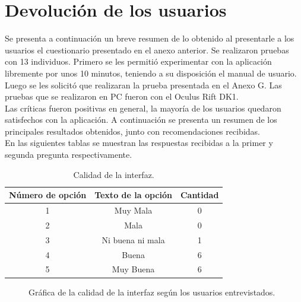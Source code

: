 \documentclass[12pt]{article}
\begin{document}
\section{Devolución de los usuarios}
Se presenta a continuación un breve resumen de lo obtenido al presentarle a los usuarios el cuestionario presentado en el anexo anterior. Se realizaron pruebas con 13 individuos. Primero se les permitió experimentar con la aplicación libremente por unos 10 minutos, teniendo a su disposición el manual de usuario. Luego se les solicitó que realizaran la prueba presentada en el Anexo G. Las pruebas que se realizaron en PC fueron con el Oculus Rift DK1.
\\Las críticas fueron positivas en general, la mayoría de los usuarios quedaron satisfechos con la aplicación. A continuación se presenta un resumen de los principales resultados obtenidos, junto con recomendaciones recibidas.
\\En las siguientes tablas se muestran las respuestas recibidas a la primer y segunda pregunta respectivamente.
\begin{table}[h!]
  \centering
  \label{tab:table1}
  \begin{tabular}{ccc}
    \toprule
    Número de opción &  Texto de la opción &Cantidad\\
    \midrule
    1 & Muy Mala & 0 \\
    2 & Mala & 0 \\
    3 & Ni buena ni mala & 1 \\
    4 & Buena & 6\\
    5 & Muy Buena & 6\\
    \bottomrule
  \end{tabular}
  \caption{Calidad de la interfaz.}
\end{table}

  \begin{figure}[!ht]
    \centering
    \caption{Gráfica de la calidad de la interfaz según los usuarios entrevistados.}
    \label{fig:data}
  \end{figure}
\end{document}
